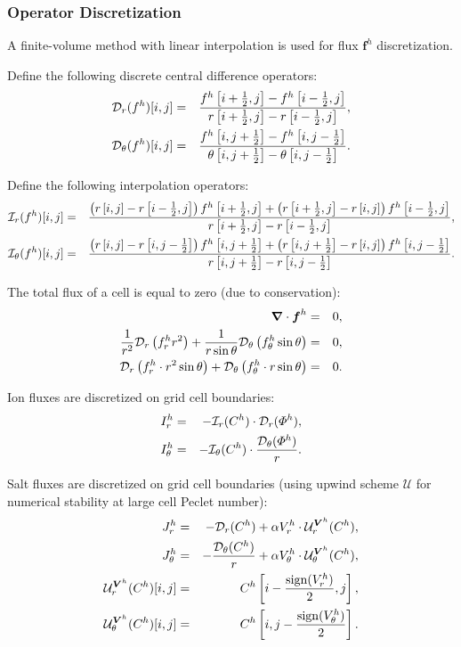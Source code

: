 \subsubsection{Operator Discretization}
A finite-volume method with linear interpolation is used for flux 
$\boldsymbol{f}^h$ discretization. 

Define the following discrete central difference operators:
\begin{eqnarray}
\mathcal{D}_r(f^h)[i,j] &=& \frac{f^h\left[i+\frac{1}{2},j\right] - f^h\left[i-\frac{1}{2},j\right]}
                       {r\left[i+\frac{1}{2},j\right] - r\left[i-\frac{1}{2},j\right]}, \\
\mathcal{D}_\theta(f^h)[i,j] &=& \frac{f^h\left[i,j+\frac{1}{2}\right] - f^h\left[i,j-\frac{1}{2}\right]}
					   {\theta\left[i,j+\frac{1}{2}\right] - \theta\left[i,j-\frac{1}{2}\right]}.
\end{eqnarray}

Define the following interpolation operators:
\begin{eqnarray}
\mathcal{I}_r(f^h)[i,j] &=& \frac{
\left(r\left[i,j\right] - r\left[i-\frac{1}{2},j\right]\right) 
  f^h\left[i+\frac{1}{2},j\right] + 
\left(r\left[i+\frac{1}{2},j\right] - r\left[i,j\right]\right) 
  f^h\left[i-\frac{1}{2},j\right] 
}{r\left[i+\frac{1}{2},j\right] - r\left[i-\frac{1}{2},j\right]},
\\
\mathcal{I}_\theta(f^h)[i,j] &=& 
\frac{
\left(r\left[i,j\right] - r\left[i,j-\frac{1}{2}\right]\right) 
  f^h\left[i,j+\frac{1}{2}\right] + 
\left(r\left[i,j+\frac{1}{2}\right] - r\left[i,j\right]\right) 
  f^h\left[i,j-\frac{1}{2}\right] 
}{r\left[i,j+\frac{1}{2}\right] - r\left[i,j-\frac{1}{2}\right]}.
\end{eqnarray}

The total flux of a cell is equal to zero (due to conservation):
\begin{eqnarray}
\boldsymbol{\nabla} \cdot \boldsymbol{f}^h &=& 0, 
\\
\frac{1}{r^2} \mathcal{D}_r\left(f^h_r r^2\right) + 
\frac{1}{r \sin\theta} \mathcal{D}_\theta\left(f^h_\theta \sin\theta\right) &=& 0, 
\\
\mathcal{D}_r\left(f^h_r \cdot r^2 \sin\theta\right) + 
\mathcal{D}_\theta\left(f^h_\theta \cdot r \sin\theta\right) &=& 0. 
\end{eqnarray}

Ion fluxes are discretized on grid cell boundaries:
\begin{eqnarray}
I^h_r &=& -\mathcal{I}_r(C^h) \cdot \mathcal{D}_r(\varPhi^h), \\
I^h_\theta &=& -\mathcal{I}_\theta(C^h) \cdot \frac{\mathcal{D}_\theta(\varPhi^h)}{r}.
\end{eqnarray}

Salt fluxes are discretized on grid cell boundaries 
(using upwind scheme $\mathcal{U}$ for numerical stability at large cell Peclet number):
\begin{eqnarray}
J^h_r &=& -\mathcal{D}_r(C^h) + \alpha V^h_r \cdot \mathcal{U}^{\boldsymbol{V}^h}_r (C^h), \\
J^h_\theta &=& -\frac{\mathcal{D}_\theta(C^h)}{r} + \alpha V^h_\theta \cdot \mathcal{U}^{\boldsymbol{V}^h}_\theta (C^h), \\
 \mathcal{U}^{\boldsymbol{V}^h}_r(C^h)[i,j] &=& C^h\left[i-\frac{\mathrm{sign}(V^h_r)}{2}, j\right], \\
 \mathcal{U}^{\boldsymbol{V}^h}_\theta(C^h)[i,j] &=& C^h\left[i, j-\frac{\mathrm{sign}(V^h_\theta)}{2}\right]. 
\end{eqnarray}

